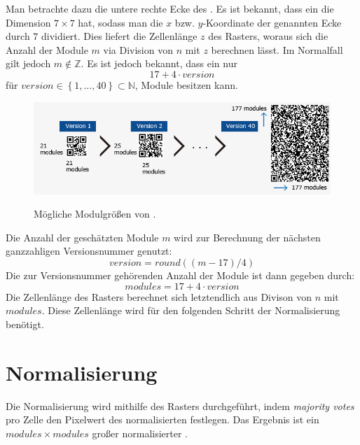 Man betrachte dazu die untere rechte Ecke des \olfpn. Es ist bekannt, dass ein \fp die Dimension $7 \times 7$ hat, sodass man die $x$ bzw. $y$-Koordinate der genannten Ecke durch $7$ dividiert. Dies liefert die Zellenlänge $z$ des Rasters, woraus sich die Anzahl der Module $m$ via Division von $n$ mit $z$ berechnen lässt. Im Normalfall gilt jedoch $m \notin \mathbb{Z}$.
Es ist jedoch bekannt, dass ein \QRCode nur 
\begin {equation*}
	17 + 4 \cdot version
\end{equation*}
für $version \in \left\{1, ..., 40\right\} \subset \mathbb{N}$, Module besitzen kann.
\begin{figure}[h]
\centering
\includegraphics[scale=0.5]{images/QRVersion.png}
\label{fig:version-qrcode}
\caption{Mögliche Modulgrößen von \QRCodes \cite{versionimage}.}
\end{figure}

\noindent Die Anzahl der geschätzten Module $m$ wird zur Berechnung der nächsten ganzzahligen Versionsnummer genutzt:
\begin{equation*}
	version = round((m-17)/4)
\end{equation*}
Die zur Versionsnummer gehörenden Anzahl der Module ist dann gegeben durch:
\begin{equation*}
	modules = 17+4 \cdot version
\end{equation*} 
Die Zellenlänge des Rasters berechnet sich letztendlich aus Divison von $n$ mit $modules$. Diese Zellenlänge wird für den folgenden Schritt der Normalisierung benötigt.

\section{Normalisierung}
Die Normalisierung wird mithilfe des Rasters durchgeführt, indem \emph{majority votes} pro Zelle den Pixelwert des normalisierten \QRCodes festlegen.
Das Ergebnis ist ein $modules \times modules$ großer normalisierter \QRCode.

